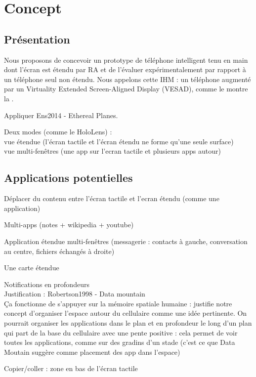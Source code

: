 \chapter{Concept}
\label{ch:concept}

\section{Présentation}

Nous proposons de concevoir un prototype de téléphone intelligent tenu en main dont l'écran est étendu par RA et de l'évaluer expérimentalement par rapport à un téléphone seul non étendu. Nous appelons cette IHM : un téléphone augmenté par un \foreignlanguage{english}{Virtuality Extended Screen-Aligned Display} (VESAD), comme le montre la .


Appliquer Ens2014 - Ethereal Planes.

Deux modes (comme le HoloLens) :\\
vue étendue (l'écran tactile et l'écran étendu ne forme qu'une seule surface)\\
vue multi-fenêtres (une app sur l'ecran tactile et plusieurs apps autour)

\section{Applications potentielles}
Déplacer du contenu entre l'écran tactile et l'ecran étendu (comme une application)

Multi-apps (notes + wikipedia + youtube)

Application étendue multi-fenêtres (messagerie : contacts à gauche, conversation au centre, fichiers échangés à droite)

Une carte étendue

Notifications en profondeurs\\
Justification : Robertson1998 - Data mountain\\
Ça fonctionne de s'appuyer sur la mémoire spatiale humaine : justifie notre concept d'organiser l'espace autour du cellulaire comme une idée pertinente. On pourrait organiser les applications dans le plan et en profondeur le long d'un plan qui part de la base du cellulaire avec une pente positive : cela permet de voir toutes les applications, comme sur des gradins d'un stade (c'est ce que Data Moutain suggère comme placement des app dans l'espace)

Copier/coller : zone en bas de l'écran tactile
